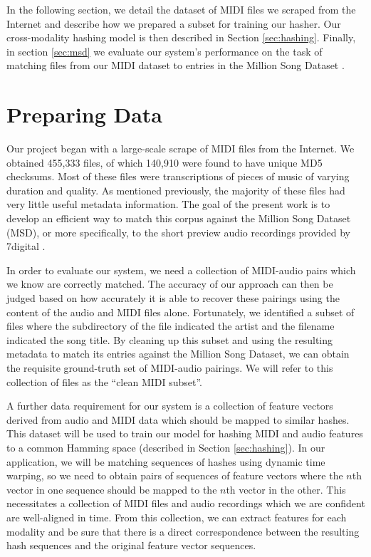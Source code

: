 \documentclass{article}
\begin{document}
In the following section, we detail the dataset of MIDI files we scraped from the Internet and describe how we prepared a subset for training our hasher.
Our cross-modality hashing model is then described in Section \ref{sec:hashing}.
Finally, in section \ref{sec:msd} we evaluate our system's performance on the task of matching files from our MIDI dataset to entries in the Million Song Dataset \cite{bertin2011million}.

\section{Preparing Data}
\label{sec:dataset}

Our project began with a large-scale scrape of MIDI files from the Internet.
We obtained 455,333 files, of which 140,910 were found to have unique MD5 checksums.
Most of these files were transcriptions of pieces of music of varying duration and quality.
As mentioned previously, the majority of these files had very little useful metadata information.
The goal of the present work is to develop an efficient way to match this corpus against the Million Song Dataset (MSD), or more specifically, to the short preview audio recordings provided by 7digital \cite{schindler2012facilitating}.

In order to evaluate our system, we need a collection of MIDI-audio pairs which we know are correctly matched.
The accuracy of our approach can then be judged based on how accurately it is able to recover these pairings using the content of the audio and MIDI files alone.
Fortunately, we identified a subset of files where the subdirectory of the file indicated the artist and the filename indicated the song title.
By cleaning up this subset and using the resulting metadata to match its entries against the Million Song Dataset, we can obtain the requisite ground-truth set of MIDI-audio pairings.
We will refer to this collection of files as the ``clean MIDI subset''.

A further data requirement for our system is a collection of feature vectors derived from audio and MIDI data which should be mapped to similar hashes.
This dataset will be used to train our model for hashing MIDI and audio features to a common Hamming space (described in Section \ref{sec:hashing}).
In our application, we will be matching sequences of hashes using dynamic time warping, so we need to obtain pairs of sequences of feature vectors where the $n$th vector in one sequence should be mapped to the $n$th vector in the other.
This necessitates a collection of MIDI files and audio recordings which we are confident are well-aligned in time.
From this collection, we can extract features for each modality and be sure that there is a direct correspondence between the resulting hash sequences and the original feature vector sequences.
\end{document}
